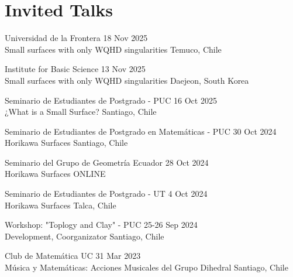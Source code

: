 \section{Invited Talks}
\secstartswithlist{}%
\begin{etaremune}
\item
  Universidad de la Frontera
  \hfill{}
  18 Nov 2025\\
  Small surfaces with only WQHD singularities
  \hfill{}
  Temuco, Chile
\item
  Institute for Basic Science
  \hfill{}
  13 Nov 2025\\
  Small surfaces with only WQHD singularities
  \hfill{}
  Daejeon, South Korea
\item
  Seminario de Estudiantes de Postgrado - PUC 
  \hfill{}
  16 Oct 2025\\
  ¿What is a Small Surface?
  \hfill{}
  Santiago, Chile
\item
  Seminario de Estudiantes de Postgrado en Matemáticas - PUC
  \hfill{}
  30 Oct 2024\\
  Horikawa Surfaces
  \hfill{}
  Santiago, Chile
\item
  Seminario del Grupo de Geometría Ecuador
  \hfill{}
  28 Oct 2024\\
  Horikawa Surfaces
  \hfill{}
  ONLINE
\item
 Seminario de Estudiantes de Postgrado - UT
  \hfill{}
  4 Oct 2024\\
  Horikawa Surfaces
  \hfill{}
  Talca, Chile
\item
 Workshop: "Toplogy and Clay" - PUC
  \hfill{}
  25-26 Sep 2024\\
  Development, Coorganizator
  \hfill{}
  Santiago, Chile

\item
 Club de Matemática UC
  \hfill{}
  31 Mar 2023\\
  Música y Matemáticas: Acciones Musicales del Grupo Dihedral
  \hfill{}
  Santiago, Chile
\end{etaremune}

